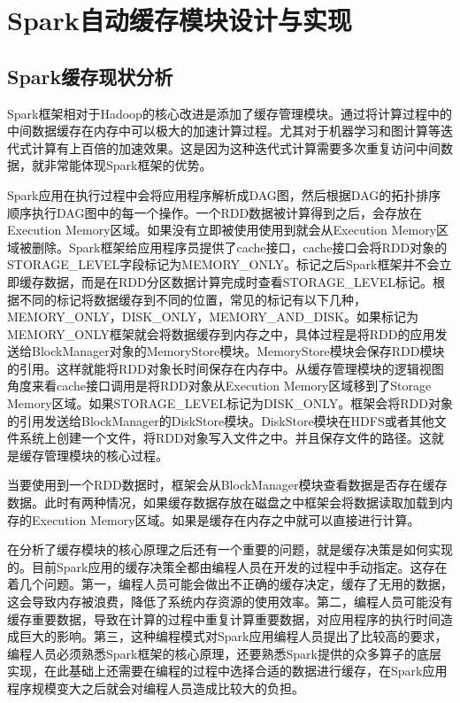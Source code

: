 \chapter{Spark自动缓存模块设计与实现}\label{chap:auto-cache}

\section{Spark缓存现状分析}
Spark框架相对于Hadoop的核心改进是添加了缓存管理模块。通过将计算过程中的中间数据缓存在内存中可以极大的加速计算过程。尤其对于机器学习和图计算等迭代式计算有上百倍的加速效果。这是因为这种迭代式计算需要多次重复访问中间数据，就非常能体现Spark框架的优势。

Spark应用在执行过程中会将应用程序解析成DAG图，然后根据DAG的拓扑排序顺序执行DAG图中的每一个操作。一个RDD数据被计算得到之后，会存放在Execution Memory区域。如果没有立即被使用使用到就会从Execution Memory区域被删除。Spark框架给应用程序员提供了cache接口，cache接口会将RDD对象的STORAGE\_LEVEL字段标记为MEMORY\_ONLY。标记之后Spark框架并不会立即缓存数据，而是在RDD分区数据计算完成时查看STORAGE\_LEVEL标记。根据不同的标记将数据缓存到不同的位置，常见的标记有以下几种，MEMORY\_ONLY，DISK\_ONLY，MEMORY\_AND\_DISK。如果标记为MEMORY\_ONLY框架就会将数据缓存到内存之中，具体过程是将RDD的应用发送给BlockManager对象的MemoryStore模块。MemoryStore模块会保存RDD模块的引用。这样就能将RDD对象长时间保存在内存中。从缓存管理模块的逻辑视图角度来看cache接口调用是将RDD对象从Execution Memory区域移到了Storage Memory区域。如果STORAGE\_LEVEL标记为DISK\_ONLY。框架会将RDD对象的引用发送给BlockManager的DiskStore模块。DiskStore模块在HDFS或者其他文件系统上创建一个文件，将RDD对象写入文件之中。并且保存文件的路径。这就是缓存管理模块的核心过程。

当要使用到一个RDD数据时，框架会从BlockManager模块查看数据是否存在缓存数据。此时有两种情况，如果缓存数据存放在磁盘之中框架会将数据读取加载到内存的Execution Memory区域。如果是缓存在内存之中就可以直接进行计算。

在分析了缓存模块的核心原理之后还有一个重要的问题，就是缓存决策是如何实现的。目前Spark应用的缓存决策全都由编程人员在开发的过程中手动指定。这存在着几个问题。第一，编程人员可能会做出不正确的缓存决定，缓存了无用的数据，这会导致内存被浪费，降低了系统内存资源的使用效率。第二，编程人员可能没有缓存重要数据，导致在计算的过程中重复计算重要数据，对应用程序的执行时间造成巨大的影响。第三，这种编程模式对Spark应用编程人员提出了比较高的要求，编程人员必须熟悉Spark框架的核心原理，还要熟悉Spark提供的众多算子的底层实现，在此基础上还需要在编程的过程中选择合适的数据进行缓存，在Spark应用程序规模变大之后就会对编程人员造成比较大的负担。

